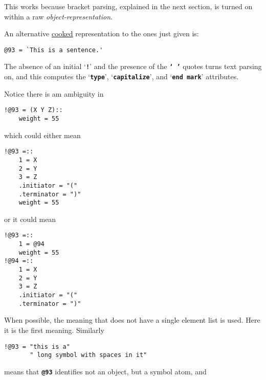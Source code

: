 \documentclass[12pt]{article}
\newcommand{\TT}[1]{{\tt \bfseries #1}}
\newenvironment{indpar}[1][0.3in]%
	{\begin{list}{}%
		     {\setlength{\itemsep}{0in}%
		      \setlength{\topsep}{0in}%
		      \setlength{\parsep}{1ex}%
		      \setlength{\labelwidth}{#1}%
		      \setlength{\leftmargin}{#1}%
		      \addtolength{\leftmargin}{\labelsep}}%
	 \item}%
	{\end{list}}
\begin{document}
This works because bracket parsing, explained in the next section,
is turned on within a raw {\em object-representation}.

An alternative \underline{cooked} representation to the ones just
given is:

\begin{indpar}\begin{verbatim}
@93 = `This is a sentence.'
\end{verbatim}\end{indpar}

The absence of an initial `\TT{!}' and the presence of the \TT{`~'}
quotes turns text parsing on, and this
computes the `\TT{type}', `\TT{capitalize}', and `\TT{end mark}' attributes.

Notice there is am ambiguity in

\begin{indpar}\begin{verbatim}
!@93 = (X Y Z)::
    weight = 55
\end{verbatim}\end{indpar}

which could either mean

\begin{indpar}\begin{verbatim}
!@93 =::
    1 = X
    2 = Y
    3 = Z
    .initiator = "("
    .terminator = ")"
    weight = 55
\end{verbatim}\end{indpar}

or it could mean

\begin{indpar}\begin{verbatim}
!@93 =::
    1 = @94
    weight = 55
!@94 =::
    1 = X
    2 = Y
    3 = Z
    .initiator = "("
    .terminator = ")"
\end{verbatim}\end{indpar}

When possible, the meaning that does not have a single element list
is used.  Here it is the first meaning.  Similarly

\begin{indpar}\begin{verbatim}
!@93 = "this is a"
       " long symbol with spaces in it"
\end{verbatim}\end{indpar}

means that \TT{@93} identifies not an object, but a symbol
atom, and
\end{document}
